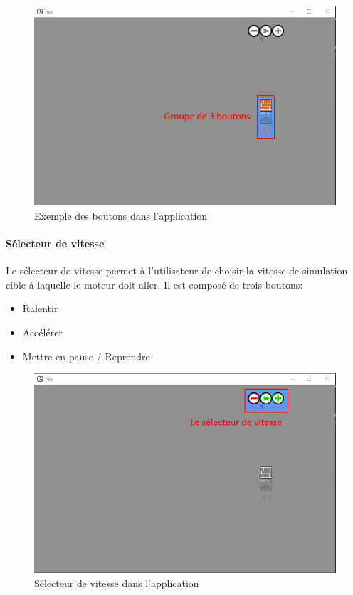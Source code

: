 \documentclass{EPUProjetDi}
\begin{document}
\begin{figure}[h]
    \centering
    \includegraphics[scale=0.5]{button.png}
    \caption{Exemple des boutons dans l'application}
    \label{fig:button_example}
\end{figure}

\pagebreak

\paragraph{Sélecteur de vitesse}

Le sélecteur de vitesse permet à l'utilisateur de choisir la vitesse de simulation cible à laquelle le moteur doit
aller. Il est composé de trois boutons:
\begin{itemize}
    \item Ralentir
    \item Accélérer
    \item Mettre en pause / Reprendre
\end{itemize}

\begin{figure}[h]
    \centering
    \includegraphics[scale=0.3]{speedslider.png}
    \caption{Sélecteur de vitesse dans l'application}
    \label{fig:speedslider_example}
\end{figure}
\end{document}
